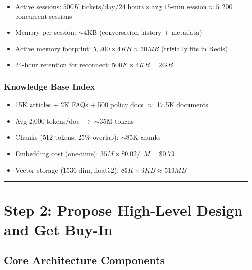 \begin{itemize}
  \item Active sessions: $500K \text{ tickets/day} / 24 \text{ hours} \times \text{avg 15-min session} \approx 5{,}200$ concurrent sessions
  \item Memory per session: $\sim$4KB (conversation history + metadata)
  \item Active memory footprint: $5{,}200 \times 4KB \approx 20MB$ (trivially fits in Redis)
  \item 24-hour retention for reconnect: $500K \times 4KB = 2GB$
\end{itemize}

\subsubsection*{Knowledge Base Index}

\begin{itemize}
  \item 15K articles + 2K FAQs + 500 policy docs $\approx$ 17.5K documents
  \item Avg 2,000 tokens/doc $\rightarrow$ $\sim$35M tokens
  \item Chunks (512 tokens, 25\% overlap): $\sim$85K chunks
  \item Embedding cost (one-time): $35M \times \$0.02/1M = \$0.70$
  \item Vector storage (1536-dim, float32): $85K \times 6KB \approx 510MB$
\end{itemize}

\bigskip\hrule\bigskip

\section*{Step 2: Propose High-Level Design and Get Buy-In}

\subsection*{Core Architecture Components}

